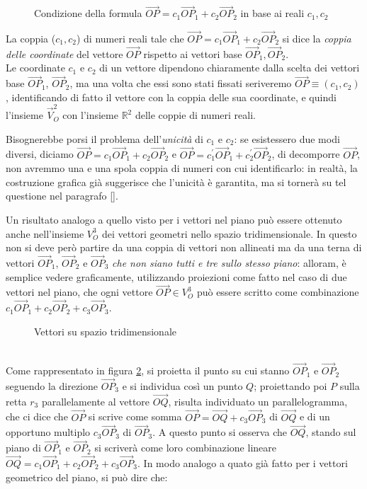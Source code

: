\begin{figure}[ht!]
  \centering
  \resizebox{6cm}{!}{
      
    }
  \caption{Condizione della formula $\vec{OP}=c_1\vec{OP}_1+c_2\vec{OP}_2$ in base ai reali $c_1,c_2$}
  \label{fig:condizionic1c2}
\end{figure}
\begin{defi}
  \label{defi:coppiaC1eC2talcheOp1}
  La coppia ($c_1,c_2$) di numeri reali tale che $\vec{OP}=c_1\vec{OP}_1+c_2\vec{OP}_2$ si dice la \textit{coppia delle coordinate} del vettore $\vec{OP}$ rispetto ai vettori base $\vec{OP}_1, \vec{OP}_2$.\\
  Le coordinate $c_1$ e $c_2$ di un vettore dipendono chiaramente dalla scelta dei vettori base $\vec{OP}_1$, $\vec{OP}_2$, ma una volta che essi sono stati fissati seriveremo $\vec{OP}\equiv (c_1,c_2)$, identificando di fatto il vettore con la coppia delle sua coordinate, e quindi l'insieme $\vec{V}_O^2$ con l'insieme $\mathds{R}^2$ delle coppie di numeri reali.
\end{defi}
\begin{oss}
  Bisognerebbe porsi il problema dell'\textit{unicità} di $c_1$ e $c_2$: se esistessero due modi diversi, diciamo $\vec{OP}=c_1\vec{OP}_1+c_2\vec{OP}_2$ e $\vec{OP}=c_1^\prime\vec{OP}_1+c_2^\prime\vec{OP}_2$, di decomporre $\vec{OP}$, non avremmo una e una spola coppia di numeri con cui identificarlo: in realtà, la costruzione grafica già suggerisce che l'unicità è garantita, ma si tornerà su tel questione nel paragrafo \ref{}.
\end{oss}
Un risultato analogo a quello visto per i vettori nel piano può essere ottenuto anche nell'insieme $V_O^3$ dei vettori geometri nello spazio tridimensionale. In questo non si deve però partire da una coppia di vettori non allineati ma da una terna di vettori $\vec{OP}_1$, $\vec{OP}_2$ e $\vec{OP}_3$ \textit{che non siano tutti e tre sullo stesso piano}: alloram, è semplice vedere graficamente, utilizzando proiezioni come fatto nel caso di due vettori nel piano, che ogni vettore $\vec{OP}\in V_O^3$ può essere scritto come combinazione $c_1\vec{OP}_1+c_2\vec{OP}_2+c_3\vec{OP}_3$.
\begin{figure}[ht!]
  \centering
  \resizebox{6cm}{!}{
      
    }
  \caption{Vettori su spazio tridimensionale}
  \label{fig:vectspaztridim}
\end{figure}\\
Come rappresentato in figura \ref{fig:vectspaztridim}, si proietta il punto su cui stanno $\vec{OP}_1$ e $\vec{OP}_2$ seguendo la direzione $\vec{OP}_3$ e si individua così un punto $Q$; proiettando poi $P$ sulla retta $r_3$ parallelamente al vettore $\vec{OQ}$, risulta individuato un parallelogramma, che ci dice che $\vec{OP}$ si scrive come somma $\vec{OP}=\vec{OQ}+c_3\vec{OP}_3$ di $\vec{OQ}$ e di un opportuno multiplo $c_3\vec{OP}_3$ di $\vec{OP}_3$. A questo punto si osserva che $\vec{OQ}$, stando sul piano di $\vec{OP}_1$ e $\vec{OP}_2$ si scriverà come loro combinazione lineare $\vec{OQ}= c_1\vec{OP}_1+c_2\vec{OP}_2+c_3\vec{OP}_3$. In modo analogo a quato già fatto per i vettori geometrico del piano, si può dire che:
